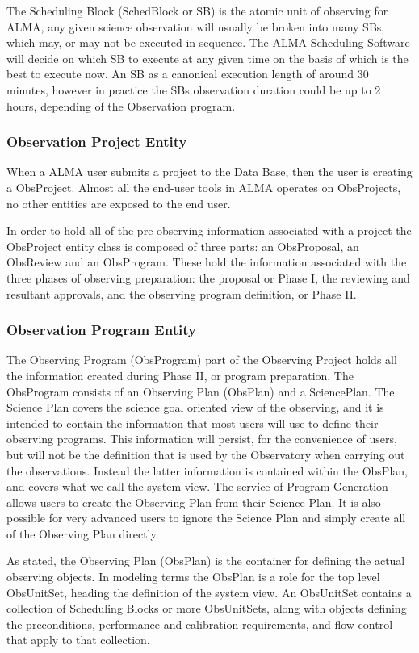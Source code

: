 \documentclass[11pt]{article}
\begin{document}
The Scheduling Block (SchedBlock or SB) is the atomic unit of observing for ALMA, any given science observation will usually be broken into many SBs, which may, or may not be executed in sequence. The ALMA Scheduling Software will decide on which SB to execute at any given time on the basis of which is the best to execute now. An SB as a canonical execution length of around 30 minutes, however in practice the SBs observation duration could be up to 2 hours, depending of the Observation program.

\subsubsection*{Observation Project Entity}
When a ALMA user submits a project to the Data Base, then the user is creating a ObsProject. Almost all the end-user tools in ALMA operates on ObsProjects, no other entities are exposed to the end user.

In order to hold all of the pre-observing information associated with a project the ObsProject entity class is composed of three parts: an ObsProposal, an ObsReview and an ObsProgram. These hold the information associated with the three phases of observing preparation: the proposal or Phase I, the reviewing and resultant approvals, and the observing program definition, or Phase II.

\subsubsection*{Observation Program Entity}
The Observing Program (ObsProgram) part of the Observing Project holds all the information created during Phase II, or program preparation. The ObsProgram consists of an Observing Plan (ObsPlan) and a SciencePlan. The Science Plan covers the science goal oriented view of the observing, and it is intended to contain the information that most users will use to define their observing programs. This information will persist, for the convenience of users, but will not be the definition that is used by the Observatory when carrying out the observations. Instead the latter information is contained within the ObsPlan, and covers what we call the system view. The service of Program Generation allows users to create the Observing Plan from their Science Plan. It is also possible for very advanced users to ignore the Science Plan and simply create all of the Observing Plan directly.

As stated, the Observing Plan (ObsPlan) is the container for defining the actual observing objects. In modeling terms the ObsPlan is a role for the top level ObsUnitSet, heading the definition of the system view. An ObsUnitSet contains a collection of Scheduling Blocks or more ObsUnitSets, along with objects defining the preconditions, performance and calibration requirements, and flow control that apply to that collection.
\end{document}
